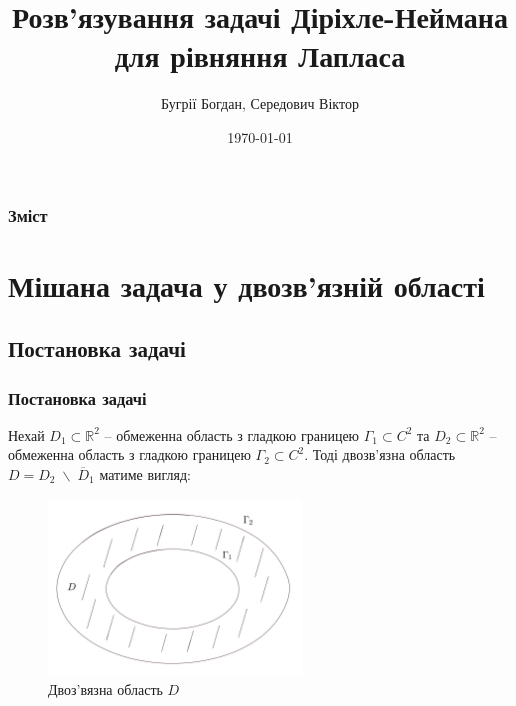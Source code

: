 \documentclass{beamer}
\title[Short title]{Розв'язування задачі Діріхле-Неймана для рівняння Лапласа} %
\author{Бугрії Богдан, Середович Віктор} %
\institute[UCLA] %
{
	Львівський національний університет імені Івана Франка \\
	Факультет прикладної математики та інформатики 
}
\date{\today} %
\numberwithin{equation}{section}
\begin{document}
	
	\begin{frame}
		\titlepage
	\end{frame}
	
	
	\begin{frame}
		\frametitle{Зміст}
		\tableofcontents
	\end{frame}

	\section{Мішана задача у двозв'язній області} 

	\subsection{Постановка задачі}
	
	\begin{frame}
		\frametitle{Постановка задачі}
		Нехай $D_1 \subset \mathbb{R}^2$ – обмеженна область з гладкою границею $\Gamma_1 \subset C^2$ та $D_2 \subset \mathbb{R}^2$ – обмеженна область з гладкою границею $\Gamma_2 \subset C^2$. Тоді двозв'язна область $D = D_2 \; \backslash \; \overline{D}_1$ матиме вигляд:
	
	
		\begin{figure}[h]
			\centering
			\includegraphics[width=0.6\textwidth]{resources/doubly-connected-region}
			\caption{Двоз'вязна область $D$}
			\label{fig:double-connected-region}
		\end{figure}
	\end{frame}
	
\end{document}
